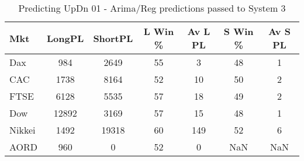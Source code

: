 \begin{table}[ht]
\centering
\caption[Predicting UpDn 01 - Arima/Reg predictions passed to System 3.]{Predicting UpDn 01 - Arima/Reg predictions passed to System 3} 
\label{tab:chp_ts:01_arima_reg_sys}
\begin{tabular}{lcccccc}
  \toprule Mkt & LongPL & ShortPL & L Win \% & Av L PL & S Win \% & Av S PL \\ 
  \midrule Dax & 984 & 2649 & 55 & 3 & 48 & 1 \\ 
  CAC & 1738 & 8164 & 52 & 10 & 50 & 2 \\ 
  FTSE & 6128 & 5535 & 57 & 18 & 49 & 2 \\ 
  Dow & 12892 & 3169 & 57 & 15 & 48 & 1 \\ 
  Nikkei & 1492 & 19318 & 60 & 149 & 52 & 6 \\ 
  AORD & 960 & 0 & 52 & 0 & NaN & NaN \\ 
   \bottomrule \end{tabular}
\end{table}
